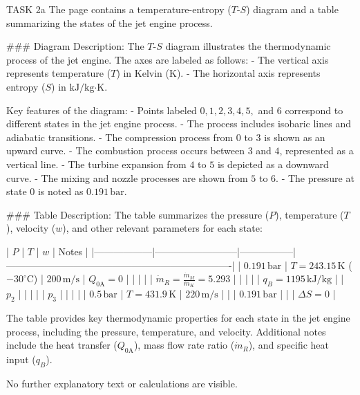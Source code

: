 TASK 2a  
The page contains a temperature-entropy (\( T \)-\( S \)) diagram and a table summarizing the states of the jet engine process.  

### Diagram Description:  
The \( T \)-\( S \) diagram illustrates the thermodynamic process of the jet engine. The axes are labeled as follows:  
- The vertical axis represents temperature (\( T \)) in Kelvin (\( \text{K} \)).  
- The horizontal axis represents entropy (\( S \)) in \( \text{kJ/kg·K} \).  

Key features of the diagram:  
- Points labeled \( 0, 1, 2, 3, 4, 5, \) and \( 6 \) correspond to different states in the jet engine process.  
- The process includes isobaric lines and adiabatic transitions.  
- The compression process from \( 0 \) to \( 3 \) is shown as an upward curve.  
- The combustion process occurs between \( 3 \) and \( 4 \), represented as a vertical line.  
- The turbine expansion from \( 4 \) to \( 5 \) is depicted as a downward curve.  
- The mixing and nozzle processes are shown from \( 5 \) to \( 6 \).  
- The pressure at state \( 0 \) is noted as \( 0.191 \, \text{bar} \).  

### Table Description:  
The table summarizes the pressure (\( P \)), temperature (\( T \)), velocity (\( w \)), and other relevant parameters for each state:  

| \( P \)         | \( T \)                  | \( w \)         | Notes                                                                 |
|------------------|--------------------------|-----------------|----------------------------------------------------------------------|
| \( 0.191 \, \text{bar} \) | \( T = 243.15 \, \text{K} \) (\( -30^\circ\text{C} \)) | \( 200 \, \text{m/s} \) | \( Q_{\text{0A}} = 0 \)                                               |
|                  |                          |                 | \( \dot{m}_R = \frac{\dot{m}_M}{\dot{m}_K} = 5.293 \)                 |
|                  |                          |                 | \( q_B = 1195 \, \text{kJ/kg} \)                                      |
| \( p_2 \)       |                          |                 |                                                                      |
| \( p_3 \)       |                          |                 |                                                                      |
| \( 0.5 \, \text{bar} \) | \( T = 431.9 \, \text{K} \)          | \( 220 \, \text{m/s} \) |                                                                      |
| \( 0.191 \, \text{bar} \) |                          |                 | \( \Delta S = 0 \)                                                   |  

The table provides key thermodynamic properties for each state in the jet engine process, including the pressure, temperature, and velocity. Additional notes include the heat transfer (\( Q_{\text{0A}} \)), mass flow rate ratio (\( \dot{m}_R \)), and specific heat input (\( q_B \)).  

No further explanatory text or calculations are visible.
